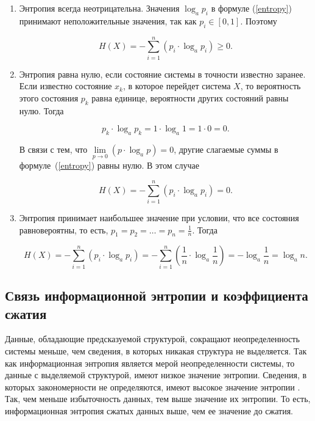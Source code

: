 \begin{enumerate}
	\item Энтропия всегда неотрицательна. Значения $\log_{a} p_{i}$ в формуле (\ref{entropy}) принимают неположительные значения, так как $p_{i} \in [0, 1]$. Поэтому
	
\begin{equation}
	H(X) = -\sum_{i = 1}^n (p_{i} \cdot \log_{a} p_{i}) \geqslant 0.
\end{equation}

	\item\label{property2} Энтропия равна нулю, если состояние системы в точности известно заранее. Если известно состояние $x_{k}$, в которое перейдет система $X$, то вероятность этого состояния $p_{k}$ равна единице, вероятности других состояний равны нулю. Тогда
	
\begin{equation}
	p_{k} \cdot \log_{a} p_{k} = 1 \cdot \log_{a} 1 = 1 \cdot 0 = 0.
\end{equation}

В связи с тем, что $\lim\limits_{p \to 0} (p \cdot \log_{a}p) = 0$, другие слагаемые суммы в формуле~(\ref{entropy}) равны нулю. В этом случае 

\begin{equation}
	H(X) = -\sum_{i = 1}^n (p_{i} \cdot \log_{a} p_{i}) = 0.
\end{equation}

	\item\label{property3} Энтропия принимает наибольшее значение при условии, что все состояния равновероятны, то есть, $p_{1} = p_{2} = \dots = p_{n} = \frac{1}{n}$. Тогда
	
\begin{equation}
	H(X) = -\sum_{i = 1}^n (p_{i} \cdot \log_{a} p_{i}) = -\sum_{i = 1}^n (\frac{1}{n} \cdot \log_{a} \frac{1}{n}) = -\log_{a} \frac{1}{n} = \log_{a} n.
\end{equation}
	
\end{enumerate}

\subsection{Связь информационной энтропии и коэффициента сжатия}

Данные, обладающие предсказуемой структурой, сокращают неопределенность системы меньше, чем сведения, в которых никакая структура не выделяется. Так как информационная энтропия является мерой неопределенности системы, то данные с выделяемой структурой, имеют низкое значение энтропии. Сведения, в которых закономерности не определяются, имеют высокое значение энтропии \cite{relation}. Так, чем меньше избыточность данных, тем выше значение их энтропии. То есть, информационная энтропия сжатых данных выше, чем ее значение до сжатия.

